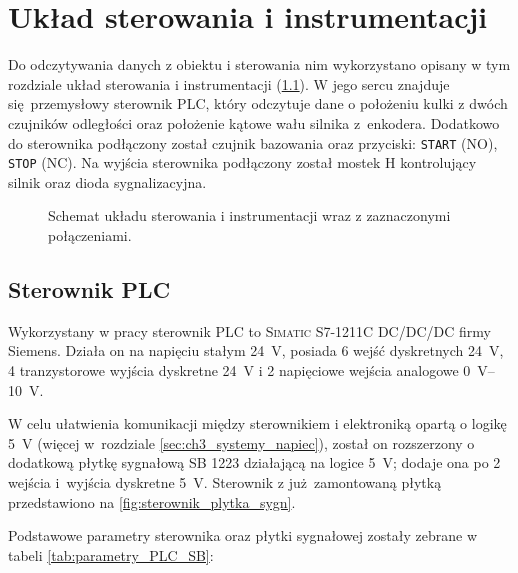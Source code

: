 \chapter{Układ sterowania i instrumentacji}
\label{cha:ch3_uklad_ster_i_instrumentacji}

Do odczytywania danych z obiektu i sterowania nim wykorzystano opisany w tym rozdziale układ sterowania i instrumentacji (\cref{fig:schemat_ukl_sterowania_instrumentacji}). W jego sercu znajduje się przemysłowy sterownik PLC, który odczytuje dane o położeniu kulki z dwóch czujników odległości oraz położenie kątowe wału silnika z~enkodera. Dodatkowo do sterownika podłączony został czujnik bazowania oraz przyciski: \texttt{START} (NO), \texttt{STOP} (NC). Na wyjścia sterownika podłączony został mostek H kontrolujący silnik oraz dioda sygnalizacyjna.

\begin{figure}[H]
    \centering
    
    \caption{Schemat układu sterowania i instrumentacji wraz z zaznaczonymi połączeniami.}
    \label{fig:schemat_ukl_sterowania_instrumentacji}
\end{figure}

\section{Sterownik PLC}
\label{sec:ch3_PLC}

Wykorzystany w pracy sterownik PLC to \textsc{Simatic S7-1211C DC/DC/DC} firmy Siemens. Działa on na napięciu stałym \SI{24}{V}, posiada 6 wejść dyskretnych \SI{24}{V}, 4 tranzystorowe wyjścia dyskretne \SI{24}{V} i 2 napięciowe wejścia analogowe \SIrange{0}{10}{V}.

W celu ułatwienia komunikacji między sterownikiem i elektroniką opartą o logikę \SI{5}{V} (więcej w~rozdziale \ref{sec:ch3_systemy_napiec}), został on rozszerzony o dodatkową płytkę sygnałową SB 1223 działającą na logice \SI{5}{V}; dodaje ona po 2 wejścia i~wyjścia dyskretne \SI{5}{V}. Sterownik z już zamontowaną płytką przedstawiono na \cref{fig:sterownik_plytka_sygn}.

Podstawowe parametry sterownika oraz płytki sygnałowej zostały zebrane w tabeli \ref{tab:parametry_PLC_SB}:

